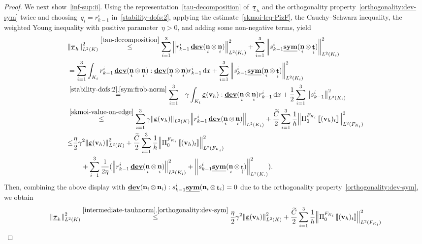 \documentclass[10pt,a4paper]{amsart}
\newcommand{\Ctilde}{\widetilde{C}}
\newcommand{\F}{F}
\newcommand{\Fi}{{\F_{\Ki}}}
\newcommand{\K}{K}
\newcommand{\Ki}{{\K_i}}
\newcommand{\Ltwo}{L^2}
\newcommand{\Norm}[1]{{\left\|{#1} \right\|}}
\newcommand{\PizFi}{\Pi_0^{\Fi}}
\DeclareMathOperator{\dev}{\underline{\mathbf{dev}}}
\newcommand{\dx}{\, \mathrm{d}x}
\newcommand{\epsbfun}{\underline{\boldsymbol{\varepsilon}}}
\newcommand{\jump}[1]{\left[\!\left[#1\right]\!\right]}
\DeclareMathOperator{\norm}{\bf{n}}
\newcommand{\normi}{\norm_i}
\newcommand{\qi}{q_{i}}
\newcommand{\rkmoi}{r_{k-1}^i}
\newcommand{\skmoi}{s_{k-1}^i}
\newcommand{\sym}{\underline{\bf{sym}}}
\DeclareMathOperator{\tang}{\bf{t}}
\newcommand{\tangi}{\tang_i}
\newcommand{\tangscalar}{t}
\newcommand{\taubfh}{\underline{\boldsymbol{\tau}}_h}
\newcommand{\vbfh}{\mathbf{v}_h}
\begin{document}
\begin{proof}
We next show~\eqref{inf-sup:ii}.
Using the representation~\eqref{tau-decomposition} of~$\taubfh$
and the orthogonality property~\eqref{orthogonality:dev-sym} twice and
choosing~$\qi = \rkmoi$ in~\eqref{stability-dofs:2},
applying
the estimate~\eqref{skmoi-leq-PizF},
the Cauchy--Schwarz inequality,
the weighted Young inequality with positive parameter~$\eta >0$,
and adding some non-negative terms,
yield
\begin{equation} \label{intermediate-tauhnorm}
\begin{split}
&\Norm{\taubfh}_{\Ltwo(\K)}^2
\overset{\eqref{tau-decomposition}}{\leq}
\sum_{i=1}^3 \Norm{\rkmoi\dev(\normi\otimes\normi)}_{\Ltwo(\Ki)}^2 + \sum_{i=1}^3\Norm{\skmoi\sym(\normi\otimes\tangi)}_{\Ltwo(\Ki)}^2 \\
&= \sum_{i=1}^3 \int_{\Ki}\rkmoi\dev(\normi\otimes\normi):\dev(\normi\otimes\normi)\rkmoi\dx + \sum_{i=1}^3\Norm{\skmoi\sym(\normi\otimes\tangi)}_{\Ltwo(\Ki)}^2 \\
&\overset{\eqref{stability-dofs:2},\eqref{sym:frob-norm}}{=}
\sum_{i=1}^3 - \gamma\int_{\Ki} \epsbfun(\vbfh):\dev(\normi\otimes\normi)\rkmoi \dx
    + \frac12\sum_{i=1}^3 \Norm{\skmoi}_{\Ltwo(\Ki)}^2 \\
&\overset{\eqref{skmoi-value-on-edge}}{\leq}
\sum_{i=1}^3 \gamma\Norm{\epsbfun(\vbfh)}_{\Ltwo(\K)} \Norm{\rkmoi \dev(\normi\otimes\normi)}_{\Ltwo(\Ki)}
    +  \frac{\Ctilde}{2}\sum_{i=1}^3\frac{1}{h} \Norm{\PizFi\jump{(\vbfh)_{\tangscalar}}}^2_{\Ltwo(\Fi)} \\
&{\leq}
\frac{\eta}{2}\gamma^2\Norm{\epsbfun(\vbfh)}^2_{\Ltwo(\K)}
    +  \frac{\Ctilde}{2}\sum_{i=1}^3 \frac{1}{h} \Norm{\PizFi\jump{(\vbfh)_{\tangscalar}}}^2_{\Ltwo(\Fi)} \\
&\qquad    + \sum_{i=1}^3 \frac{1}{2\eta}(\Norm{\rkmoi \dev(\normi\otimes\normi)}^2_{\Ltwo(\Ki)}
        + \Norm{\skmoi \sym(\normi\otimes\tangi)}^2_{\Ltwo(\Ki)}).
\end{split}
\end{equation}
Then,
combining the above display
with
$\dev(\normi\otimes\normi) : \skmoi \sym(\normi\otimes\tangi)= 0$
due to the orthogonality property~\eqref{orthogonality:dev-sym},
we obtain
\begin{equation*}
\begin{split}
\Norm{\taubfh}_{\Ltwo(\K)}^2
&\overset{\eqref{intermediate-tauhnorm},\eqref{orthogonality:dev-sym}}{\leq}
\frac{\eta}{2}\gamma^2\Norm{\epsbfun(\vbfh)}^2_{\Ltwo(\K)}
    +  \frac{\Ctilde}{2}\sum_{i=1}^3 \frac{1}{h} \Norm{\PizFi\jump{(\vbfh)_{\tangscalar}}}^2_{\Ltwo(\Fi)} \\

\end{split}
\end{equation*}
\end{proof}
\end{document}
